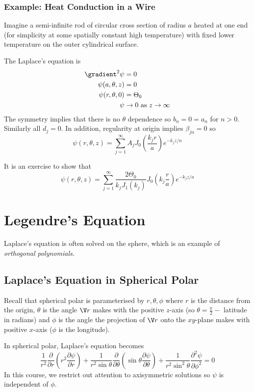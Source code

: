 \documentclass[a4paper]{article}
\newcommand*\grad{\gradient}
\newcommand*\laplace{\grad^2}
\newcommand*\lap{\laplace}
\begin{document}
\subsubsection{Example: Heat Conduction in a Wire}

Imagine a semi-infinite rod of circular cross section of radius \(a\) heated at one end (for simplicity at some spatially constant high temperature) with fixed lower temperature on the outer cylindrical surface.

The Laplace's equation is
\begin{align*}
  \lap \psi &= 0 \\
  \psi(a, \theta, z) &= 0 \\
  \psi(r, \theta, 0) &= \Theta_0 \\
  \psi &\to 0 \text{ as } z \to \infty
\end{align*}
The symmetry implies that there is no \(\theta\) dependence so \(b_n = 0 = a_n\) for \(n > 0\). Similarly all \(d_j = 0\). In addition, regularity at origin implies \(\beta_{jn} = 0\) so
\[
  \psi(r, \theta, z) = \sum_{j = 1}^{\infty} A_j J_0 \left( \frac{k_j r}{a} \right) e^{-k_jz/n}
\]

It is an exercise to show that
\[
  \psi(r, \theta, z) = \sum_{j = 1}^{\infty} \frac{2 \Theta_0}{k_j J_1(k_j)} J_0 \left( k_j \frac{r}{a} \right) e^{-k_j z/a}
\]

\section{Legendre's Equation}

Laplace's equation is often solved on the sphere, which is an example of \emph{orthogonal polynomials}.

\subsection{Laplace's Equation in Spherical Polar}

Recall that spherical polar is parameterised by \(r, \theta, \phi\) where \(r\) is the distance from the origin, \(\theta\) is the angle \(\V r\) makes with the positive \(z\)-axis (so \(\theta = \frac{\pi}{2} -\) latitude in radians) and \(\phi\) is the angle the projection of \(\V r\) onto the \(xy\)-plane makes with positive \(x\)-axis (\(\phi\) is the longitude).

In spherical polar, Laplace's equation becomes
\[
  \frac{1}{r^2} \frac{\partial  }{\partial r} \left( r^2 \frac{\partial \psi}{\partial r} \right) + \frac{1}{r^2 \sin \theta} \frac{\partial  }{\partial \theta} \left( \sin \theta \frac{\partial \psi}{\partial \theta} \right) + \frac{1}{r^2\sin^2 \theta} \frac{\partial^2 \psi}{\partial \phi^2} = 0
\]
In this course, we restrict out attention to axisymmetric solutions so \(\psi\) is independent of \(\phi\).
\end{document}
